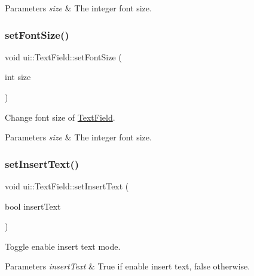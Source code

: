\begin{DoxyParams}{Parameters}
{\em size} & The integer font size. \\
\hline
\end{DoxyParams}
\mbox{\label{classui_1_1TextField_afeac699e913b7fad0d171745c98f0915}} 
\subsubsection{\texorpdfstring{set\+Font\+Size()}{setFontSize()}\hspace{0.1cm}{\footnotesize\ttfamily [2/2]}}
{\footnotesize\ttfamily void ui\+::\+Text\+Field\+::set\+Font\+Size (\begin{DoxyParamCaption}\item[{int}]{size }\end{DoxyParamCaption})}



Change font size of \hyperlink{classui_1_1TextField}{Text\+Field}. 


\begin{DoxyParams}{Parameters}
{\em size} & The integer font size. \\
\hline
\end{DoxyParams}
\mbox{\label{classui_1_1TextField_a87a947d81dffe504e2a1abd0712d7efc}} 
\subsubsection{\texorpdfstring{set\+Insert\+Text()}{setInsertText()}\hspace{0.1cm}{\footnotesize\ttfamily [1/2]}}
{\footnotesize\ttfamily void ui\+::\+Text\+Field\+::set\+Insert\+Text (\begin{DoxyParamCaption}\item[{bool}]{insert\+Text }\end{DoxyParamCaption})}



Toggle enable insert text mode. 


\begin{DoxyParams}{Parameters}
{\em insert\+Text} & True if enable insert text, false otherwise. \\
\hline
\end{DoxyParams}
\mbox{\label{classui_1_1TextField_a87a947d81dffe504e2a1abd0712d7efc}} 
